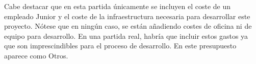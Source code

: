         \begin{text}
                Cabe destacar que en esta partida únicamente se incluyen el coste de un empleado Junior y el coste de la infraestructura necesaria para desarrollar este proyecto. Nótese que en ningún caso, se están añadiendo costes de oficina ni de equipo para desarrollo. En una partida real, habría que incluir estos gastos ya que son imprescindibles para el proceso de desarrollo. En este presupuesto aparece como Otros.
        \end{text}